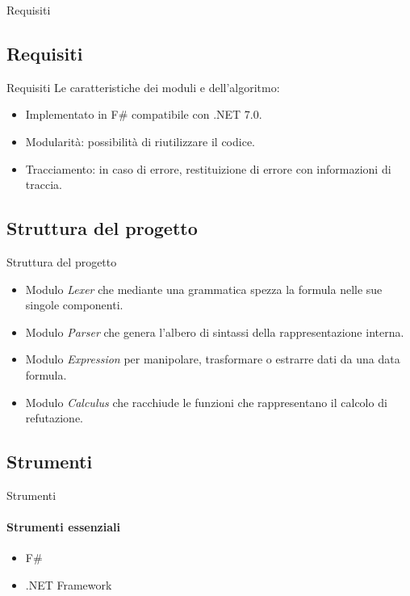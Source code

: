\documentclass{beamer}
\begin{document}
\begin{darkframes}
\begin{frame}{Requisiti}
    \end{frame}

    \subsection{Requisiti}
    \begin{frame}{Requisiti}
        Le caratteristiche dei moduli e dell'algoritmo:
        \begin{itemize}
            \item Implementato in F\# compatibile con .NET 7.0.
            \item Modularità: possibilità di riutilizzare il codice.
            \item Tracciamento: in caso di errore, restituizione di errore con informazioni di traccia.
        \end{itemize}
    \end{frame}

    \subsection{Struttura del progetto}
    \begin{frame}{Struttura del progetto}
        \begin{itemize}
            \item Modulo \textit{Lexer} che mediante una grammatica spezza la formula nelle sue singole componenti.
            \item Modulo \textit{Parser} che genera l'albero di sintassi della rappresentazione interna.
            \item Modulo \textit{Expression} per manipolare, trasformare o estrarre dati da una data formula.
            \item Modulo \textit{Calculus} che racchiude le funzioni che rappresentano il calcolo di refutazione.
        \end{itemize}
    \end{frame}

    \subsection{Strumenti}
    \begin{frame}{Strumenti}
        \framesubtitle{Strumenti essenziali}
        \begin{itemize}
            \item F\#
            \item .NET Framework
        \end{itemize}
    \end{frame}


\end{darkframes}
\end{document}
